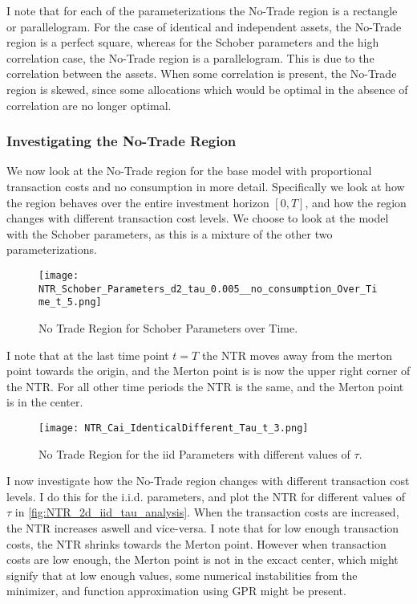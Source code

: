 \documentclass[11pt]{article}
\begin{document}
I note that for each of the parameterizations the No-Trade region is a rectangle or parallelogram.
For the case of identical and independent assets, the No-Trade region is a perfect square, whereas for the Schober parameters and the high correlation case,
the No-Trade region is a parallelogram. This is due to the correlation between the assets. When some correlation is present, the No-Trade region is skewed,
since some allocations which would be optimal in the absence of correlation are no longer optimal. 
\subsubsection{Investigating the No-Trade Region} \label{Subsubsection: InvestigatingNTR}
We now look at the No-Trade region for the base model with proportional transaction costs and no consumption in more detail.
Specifically we look at how the region behaves over the entire investment horizon $[0, T]$, and how the region changes with different transaction cost levels.
We choose to look at the model with the Schober parameters, as this is a mixture of the other two parameterizations.

\begin{figure}[!ht]
    \centering
    \texttt{[image: NTR\_Schober\_Parameters\_d2\_tau\_0.005\_\_no\_consumption\_Over\_Time\_t\_5.png]}
    \caption{No Trade Region for Schober Parameters over Time.}
    \label{fig:NTR_2d_iid_standalone}
\end{figure}

I note that at the last time point $t = T$ the \ac{NTR} moves away from the merton point towards the origin, and the Merton point is is
now the upper right corner of the \ac{NTR}. For all other time periods the \ac{NTR} is the same, and the Merton point is in the center.

\begin{figure}[!ht]
    \centering
    \texttt{[image: NTR\_Cai\_IdenticalDifferent\_Tau\_t\_3.png]}
    \caption{No Trade Region for the iid Parameters with different values of $\tau$.}
    \label{fig:NTR_2d_iid_tau_analysis}
\end{figure}
I now investigate how the No-Trade region changes with different transaction cost levels.
I do this for the i.i.d. parameters, and plot the \ac{NTR} for different values of $\tau$ in \autoref{fig:NTR_2d_iid_tau_analysis}.
When the transaction costs are increased, the \ac{NTR} increases aswell and vice-versa. 
I note that for low enough transaction costs, the \ac{NTR} shrinks towards the Merton point.
However when transaction costs are low enough, the Merton point is not in the excact center, which might signify that at low enough values, some numerical instabilities from the
minimizer, and function approximation using \ac{GPR} might be present.
\end{document}
